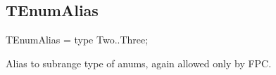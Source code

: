 \documentclass{report}
\newif\ifpdf
\begin{document}
\subsection*{TEnumAlias}
\fi
\label{ok_type_aliases-TEnumAlias}
\begin{list}{}{
\setlength{\itemindent}{0cm}
\setlength{\listparindent}{0cm}
\setlength{\leftmargin}{\evensidemargin}
\addtolength{\leftmargin}{\tmplength}
\settowidth{\labelsep}{X}
\addtolength{\leftmargin}{\labelsep}
\setlength{\labelwidth}{\tmplength}
}
\item[\textbf{Declaration}\hfill]
\ifpdf
\begin{flushleft}
\fi
\begin{ttfamily}
TEnumAlias = type Two..Three;\end{ttfamily}

\ifpdf
\end{flushleft}
\fi

\par
\item[\textbf{Description}]
Alias to subrange type of anums, again allowed only by FPC.

\end{list}
\end{document}
